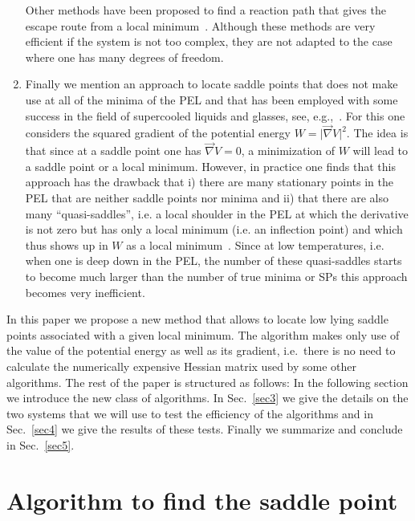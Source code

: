 \documentclass[aip,pre,twocolumn,reprint]{revtex4-1}
\begin{document}
\begin{enumerate}
Other methods have been proposed to find a reaction path that gives
the escape route from a local minimum~\cite{laio2002escaping}.  Although these
methods are very efficient if the system is not too complex, they are
not adapted to the case where one has many degrees of freedom.

\item
Finally we mention an approach to locate saddle points that does not
make use at all of the minima of the PEL and that has been employed
with some success in the field of supercooled liquids and glasses, see,
e.g.,~\cite{Web1985,angelani2000saddles,broderix2000energy}. For this
one considers the squared gradient of the potential energy $W=\vert
\vec{\nabla}V \vert^2$. The idea is that since at a saddle point one
has $\vec{\nabla}V=0$, a minimization of $W$ will lead to a saddle
point or a local minimum. However, in practice one finds that this
approach has the drawback that i) there are many stationary points
in the PEL that are neither saddle points nor minima and ii) that
there are also many ``quasi-saddles'', i.e. a local shoulder in the
PEL at which the derivative is not zero but has only a local minimum
(i.e. an inflection point) and which thus shows up in $W$ as a local
minimum~\cite{doye2002saddle,doye2003comment,angelani2002quasisaddles}.
Since at low temperatures, i.e. when one is deep down in the PEL, the
number of these quasi-saddles starts to become much larger than the
number of true minima or SPs this approach becomes very inefficient.

\end{enumerate}

In this paper we propose a new method that allows to locate low lying
saddle points associated with a given local minimum. The algorithm
makes only use of the value of the potential energy as well as its
gradient, i.e.~there is no need to calculate the numerically expensive
Hessian matrix used by some other algorithms. The rest of the paper is
structured as follows: In the following section we introduce the new
class of algorithms. In Sec.~\ref{sec3} we give the details on the two
systems that we will use to test the efficiency of the algorithms and in
Sec.~\ref{sec4} we give the results of these tests. Finally we summarize
and conclude in Sec.~\ref{sec5}.


\section{Algorithm to find the saddle point}
\label{sec2} 
\end{document}

